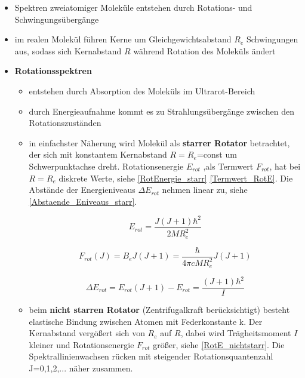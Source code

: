\begin{itemize}
    \item Spektren zweiatomiger Moleküle entstehen durch Rotations- und Schwingungsübergänge
    \item im realen Molekül führen Kerne um Gleichgewichtsabstand $R_e$ Schwingungen aus, sodass sich Kernabstand $R$ während Rotation des Moleküls ändert
    \item \textbf{Rotationsspektren}
        \begin{itemize}
            \item entstehen durch Absorption des Moleküls im Ultrarot-Bereich
            \item durch Energieaufnahme kommt es zu Strahlungsübergänge zwischen den Rotationszuständen
            \item in einfachster Näherung wird Molekül als \textbf{starrer Rotator} betrachtet, der sich mit konstantem Kernabstand $R=R_e$=const um Schwerpunktachse dreht. Rotationsenergie $E_{rot}$ ,als Termwert $F_{rot}$, hat bei $R=R_e$ diskrete Werte, siehe \ref{RotEnergie_starr} \ref{Termwert_RotE}. Die Abstände der Energieniveaus $\Delta E_{rot}$ nehmen linear zu, siehe \ref{Abstaende_Eniveaus_starr}.

                \begin{equation}
                E_{rot} = \frac{J(J+1)\hbar^2}{2MR_e^2}
                \label{RotEnergie_starr}
                \end{equation}

                \begin{equation}
                F_{rot}(J)=B_eJ(J+1)=\frac{\hbar}{4\pi cMR_e^2}J(J+1)
                \label{Termwert_RotE}
                \end{equation}

                \begin{equation}
                \Delta E_{rot}=E_{rot}(J+1)-E_{rot}=\frac{(J+1)\hbar^2}{I}
                \label{Abstaende_Eniveaus_starr}
                \end{equation}

            \item beim \textbf{nicht starren Rotator} (Zentrifugalkraft berücksichtigt) besteht elastische Bindung zwischen Atomen mit Federkonstante k. Der Kernabstand vergößert sich von $R_e$ auf $R$, dabei wird Trägheitsmoment $I$ kleiner und Rotationsenergie $F_{rot}$ größer, siehe \ref{RotE_nichtstarr}. Die Spektrallinienwachsen rücken mit steigender Rotationsquantenzahl J=0,1,2,... näher zusammen.


\end{itemize}
\end{itemize}
